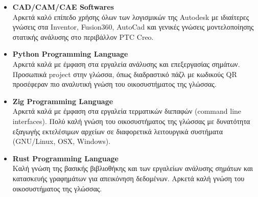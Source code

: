 \documentclass[a4paper,9pt]{extarticle}
\begin{document}
\begin{itemize}

{}
\item{\textbf{CAD/CAM/CAE Softwares}} \\
        Αρκετά καλό επίπεδο χρήσης όλων των λογισμικών της Autodesk με ιδιαίτερες γνώσεις στα Inventor, Fusion360, AutoCad και γενικές γνώσεις μοντελοποίησης στατικής ανάλυσης στο περιβάλλον PTC Creo. \\

\item{\textbf{Python Programming Language}} \\
        Αρκετά καλά με έμφαση στα εργαλεία ανάλυσης και επεξεργασίας σημάτων. Προσωπικά project στην γλώσσα, όπως διαδραστικό
        πάζλ με κωδικούς QR προσέφεραν πιο
        αναλυτική γνώση του οικοσυστήματος της γλώσσας. \\

\item{\textbf{Zig Programming Language}} \\
        Αρκετά καλά με έμφαση στα εργαλεία τερματικών διεπαφών
        (command line interfaces).
        Πολύ καλή γνώση του οικοσυστήματος της γλώσσας με δυνατότητα εξαγωγής
        εκτελέσιμων αρχείων σε διαφορετικά λειτουργικά συστήματα (GNU/Linux, OSX, Windows). \\

\item{\textbf{Rust Programming Language}} \\
        \noindent
        Καλή γνώση της βασικής βιβλιοθήκης και των εργαλείων ανάλυσης σημάτων
        και κατασκευής γραφημάτων για απεικόνηση δεδομένων.
        Αρκετά καλή γνώση του οικοσυστήματος της γλώσσας. \\


\end{itemize}
\end{document}
